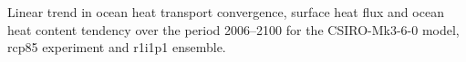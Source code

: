 \label{fig:csiro_full}
Linear trend in ocean heat transport convergence, surface heat flux and ocean heat content tendency over the period 2006--2100 for the CSIRO-Mk3-6-0 model, rcp85 experiment and r1i1p1 ensemble.